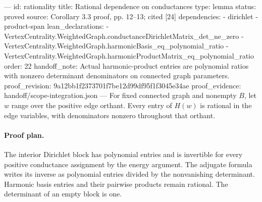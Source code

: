---
id: rationality
title: Rational dependence on conductances
type: lemma
status: proved
source: Corollary 3.3 proof, pp. 12–13; cited [24]
dependencies:
- dirichlet
- product-span
lean_declarations:
- VertexCentrality.WeightedGraph.conductanceDirichletMatrix_det_ne_zero
- VertexCentrality.WeightedGraph.harmonicBasis_eq_polynomial_ratio
- VertexCentrality.WeightedGraph.harmonicProductMatrix_eq_polynomial_ratio
order: 22
handoff_note: Actual harmonic-product entries are polynomial ratios with nonzero determinant denominators on connected graph parameters.
proof_revision: 9a12bb1f2373701f7be12d99df95f1f3045e34ae
proof_evidence: handoff/scope-integration.json
---
For fixed connected graph and nonempty $B$, let $w$ range over the positive edge orthant. Every entry of $H(w)$ is rational in the edge variables, with denominators nonzero throughout that orthant.

\paragraph{Proof plan.}
The interior Dirichlet block has polynomial entries and is invertible for every positive conductance assignment by the energy argument. The adjugate formula writes its inverse as polynomial entries divided by the nonvanishing determinant. Harmonic basis entries and their pairwise products remain rational. The determinant of an empty block is one.
